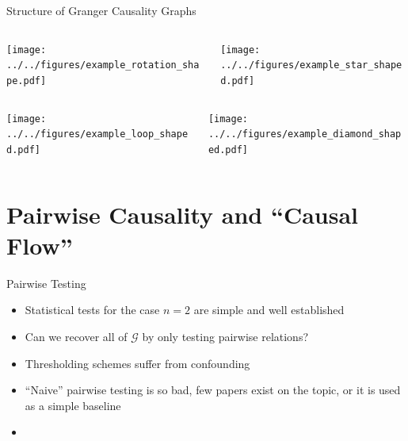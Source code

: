 \documentclass{beamer} %
\def\gcg{\mathcal{G}}  %
\newcommand{\anc}[1]{\mathcal{A}(#1)}  %
\newcommand{\gcgpath}[2]{#1 \rightarrow \cdots \rightarrow #2}  %
\begin{document}
\begin{frame}{Structure of Granger Causality Graphs}
  \begin{columns}
    \begin{column}{0.35\linewidth}
      \texttt{[image: ../../figures/example\_rotation\_shape.pdf]}\pause
    \end{column}
    \begin{column}{0.35\linewidth}
      \texttt{[image: ../../figures/example\_star\_shaped.pdf]}\pause
    \end{column}
  \end{columns}

  \begin{columns}
    \begin{column}{0.35\linewidth}
      \texttt{[image: ../../figures/example\_loop\_shaped.pdf]}\pause
    \end{column}
    \begin{column}{0.35\linewidth}
      \texttt{[image: ../../figures/example\_diamond\_shaped.pdf]}
    \end{column}
  \end{columns}
\end{frame}

\section{Pairwise Causality and ``Causal Flow''}
\begin{frame}{Pairwise Testing}
  \begin{itemize}
    \item{Statistical tests for the case $n = 2$ are simple and well established}\pause
    \item{Can we recover all of $\gcg$ by only testing pairwise relations?}\pause
    \item{Thresholding schemes suffer from confounding}\pause
    \item{``Naive'' pairwise testing is so bad, few papers exist on the topic, or it is used as a simple baseline}\pause
    \item{}
  \end{itemize}
\end{frame}
\end{document}

